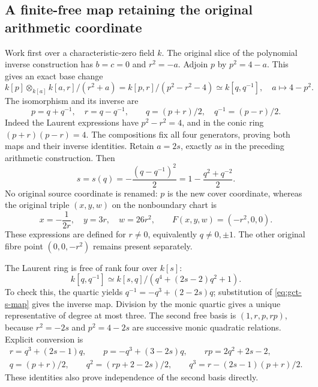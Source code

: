 \subsection{A finite-free map retaining the original arithmetic coordinate}
Work first over a characteristic-zero field $k$. The original slice of
the polynomial inverse construction has $b=c=0$ and $r^2=-a$.
Adjoin $p$ by $p^2=4-a$. This gives an exact base change
\begin{equation}\label{eq:gct-conic-map}
 k[p]\otimes_{k[a]}k[a,r]/(r^2+a)
 =k[p,r]/(p^2-r^2-4)\simeq k[q,q^{-1}],
 \quad a\longmapsto4-p^2.
\end{equation}
The isomorphism and its inverse are
\[
 p=q+q^{-1},\quad r=q-q^{-1},\qquad
 q=(p+r)/2,\quad q^{-1}=(p-r)/2.
\]
Indeed the Laurent expressions have $p^2-r^2=4$, and in the conic
ring $(p+r)(p-r)=4$. The compositions fix all four generators, proving
both maps and their inverse identities. Retain $a=2s$, exactly as in
the preceding arithmetic construction. Then
\begin{equation}\label{eq:gct-s-map}
 s=s(q)=-\frac{(q-q^{-1})^2}{2}
       =1-\frac{q^2+q^{-2}}2.
\end{equation}
No original source coordinate is renamed: $p$ is the new cover coordinate,
whereas the original triple $(x,y,w)$ on the nonboundary chart is
\[
 x=-\frac1{2r},\quad y=3r,\quad w=26r^2,
 \qquad F(x,y,w)=(-r^2,0,0).
\]
These expressions are defined for $r\ne0$, equivalently $q\ne0,\pm1$.
The other original fibre point $(0,0,-r^2)$ remains present separately.

The Laurent ring is free of rank four over $k[s]$:
\begin{equation}\label{eq:gct-quartic}
 k[q,q^{-1}]\simeq k[s,q]/(q^4+(2s-2)q^2+1).
\end{equation}
To check this, the quartic yields
$q^{-1}=-q^3+(2-2s)q$; substitution of \eqref{eq:gct-s-map} gives the
inverse map. Division by the monic quartic gives a unique representative
of degree at most three. The second free basis is $(1,r,p,rp)$, because
$r^2=-2s$ and $p^2=4-2s$ are successive monic quadratic relations.
Explicit conversion is
\begin{gather*}
 r=q^3+(2s-1)q,\qquad p=-q^3+(3-2s)q,\qquad rp=2q^2+2s-2,\\
 q=(p+r)/2,\qquad q^2=(rp+2-2s)/2,\qquad
 q^3=r-(2s-1)(p+r)/2.
\end{gather*}
These identities also prove independence of the second basis directly.

